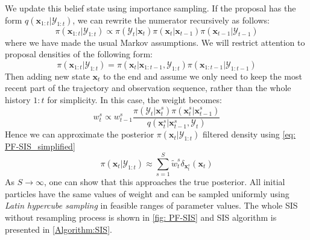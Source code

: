 We update this belief state using importance sampling. If the proposal has the form $q(\boldsymbol{x}_{1:t}|\mathcal{Y}_{1:t})$, we can rewrite the numerator recursively as follows:
\begin{equation}
    \label{eq: PF-recursive}
    \pi(\boldsymbol{x}_{1:t}|\mathcal{Y}_{1:t})
    \propto 
    \pi(\mathcal{Y}_{t}|\boldsymbol{x}_{t})
    \pi(\boldsymbol{x}_{t}|\boldsymbol{x}_{t-1})
    \pi(\boldsymbol{x}_{t-1}|\mathcal{Y}_{t-1})
\end{equation}
where we have made the usual Markov assumptions. We will restrict attention to proposal densities of the following form:
\begin{equation}
    \label{eq: PF-recursive_2}
\pi(\boldsymbol{x}_{1:t}|\mathcal{Y}_{1:t})
=
\pi(\boldsymbol{x}_{t}|\boldsymbol{x}_{1:t-1},\mathcal{Y}_{1:t})
\pi(\boldsymbol{x}_{1:t-1}|\mathcal{Y}_{1:t-1})
\end{equation}
Then adding new state $\boldsymbol{x}_{t}$ to the end and assume we only need to keep the most recent part of the trajectory and observation sequence, rather than the whole history $1:t$ for simplicity. In this case, the weight becomes:
\begin{equation}
    \label{eq: PF-modified_weight}
    w_{t}^{s}
    \propto 
    w_{t-1}^{s}
    \frac{\pi(\mathcal{Y}_{t}|\boldsymbol{x}_{t}^{s})     \pi(\boldsymbol{x}_{t}^{s}|\boldsymbol{x}_{t-1}^{s})}
    {q(\boldsymbol{x}_{t}^{s}|\boldsymbol{x}_{t-1}^{s},\mathcal{Y}_{t})} 
\end{equation}
Hence we can approximate the posterior $\pi(\boldsymbol{x}_{t}|\mathcal{Y}_{1:t})$ filtered density using \cref{eq: PF-SIS_simplified}
\begin{equation}
    \label{eq: PF-SIS_simplified}
    \pi(\boldsymbol{x}_{t}|\mathcal{Y}_{1:t})
    \approx 
    \sum_{s=1}^{S} 
    \tilde{w}_{t}^{s}
    \delta_{\boldsymbol{x}_{t}^{s}}(\boldsymbol{x}_{t})
\end{equation}
As $S \rightarrow \infty$, one can show that this approaches the true posterior. All initial particles have the same values of weight and can be sampled uniformly using \textit{Latin hypercube sampling} in feasible ranges of parameter values. The whole \acrshort{SIS} without resampling process is shown in \cref{fig: PF-SIS} and \acrshort{SIS} algorithm is presented in \ref{Algorithm:SIS}.

